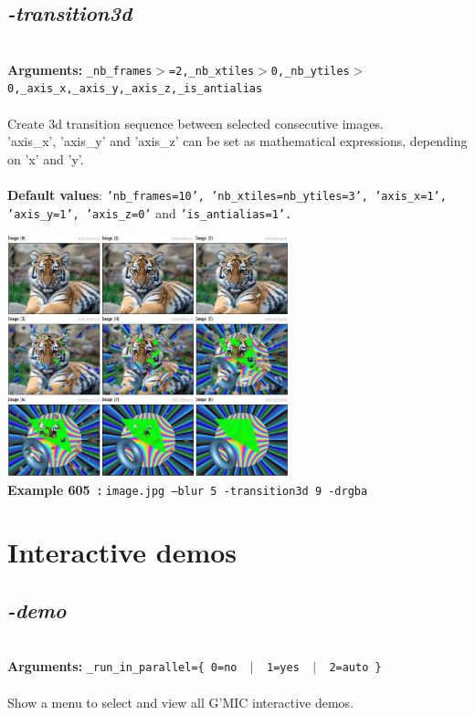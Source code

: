 \documentclass[a4paper,11pt,twoside]{book}
\begin{document}
\subsection{\emph{-transition3d} }\vspace*{-0.5em}
~\\\textbf{Arguments: } 
{\small \texttt{\_nb\_frames$>$=2,\_nb\_xtiles$>$0,\_nb\_ytiles$>$0,\_axis\_x,\_axis\_y,\_axis\_z,\_is\_antialias}}\\~\\
Create 3d transition sequence between selected consecutive images.
~\\'axis\_x', 'axis\_y' and 'axis\_z' can be set as mathematical expressions, depending on 'x' and 'y'.
~\\~\\\textbf{Default values}: {\small \texttt{'nb\_frames=10', 'nb\_xtiles=nb\_ytiles=3', 'axis\_x=1', 'axis\_y=1', 'axis\_z=0'} and \texttt{'is\_antialias=1'.}}
\begin{center}\includegraphics[keepaspectratio=true,height=7cm,width=\textwidth]{img/gmic_def605.jpg}\\
{\footnotesize \textbf{Example 605~:} \texttt{image.jpg --blur 5 -transition3d 9 -drgba}}
\end{center}
\section{Interactive demos}


\subsection{\emph{-demo} }\vspace*{-0.5em}
~\\\textbf{Arguments: } 
{\small \texttt{\_run\_in\_parallel=\{ 0=no ~$|$~ 1=yes ~$|$~ 2=auto \}}}\\~\\
Show a menu to select and view all G'MIC interactive demos.
\end{document}
